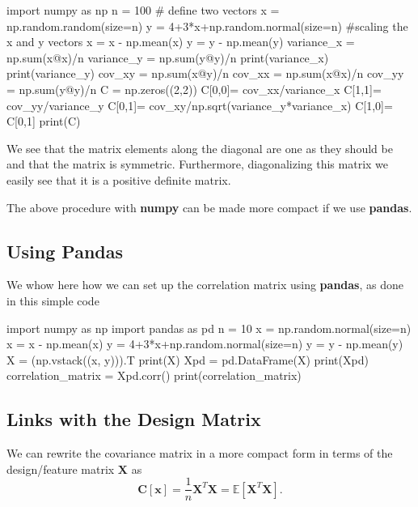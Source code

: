 \documentclass[%
oneside,                 %
final,                   %
10pt]{article}
\begin{document}
\bpycod
import numpy as np
n = 100
# define two vectors                                                                                           
x = np.random.random(size=n)
y = 4+3*x+np.random.normal(size=n)
#scaling the x and y vectors                                                                                   
x = x - np.mean(x)
y = y - np.mean(y)
variance_x = np.sum(x@x)/n
variance_y = np.sum(y@y)/n
print(variance_x)
print(variance_y)
cov_xy = np.sum(x@y)/n
cov_xx = np.sum(x@x)/n
cov_yy = np.sum(y@y)/n
C = np.zeros((2,2))
C[0,0]= cov_xx/variance_x
C[1,1]= cov_yy/variance_y
C[0,1]= cov_xy/np.sqrt(variance_y*variance_x)
C[1,0]= C[0,1]
print(C)

\epycod


We see that the matrix elements along the diagonal are one as they
should be and that the matrix is symmetric. Furthermore, diagonalizing
this matrix we easily see that it is a positive definite matrix.

The above procedure with \textbf{numpy} can be made more compact if we use \textbf{pandas}.

\subsection{Using Pandas}

We whow here how we can set up the correlation matrix using \textbf{pandas}, as done in this simple code














\bpycod
import numpy as np
import pandas as pd
n = 10
x = np.random.normal(size=n)
x = x - np.mean(x)
y = 4+3*x+np.random.normal(size=n)
y = y - np.mean(y)
X = (np.vstack((x, y))).T
print(X)
Xpd = pd.DataFrame(X)
print(Xpd)
correlation_matrix = Xpd.corr()
print(correlation_matrix)

\epycod


\subsection{Links with the Design Matrix}

We can rewrite the covariance matrix in a more compact form in terms of the design/feature matrix $\bm{X}$ as 
\[
\bm{C}[\bm{x}] = \frac{1}{n}\bm{X}^T\bm{X}= \mathbb{E}[\bm{X}^T\bm{X}].
\]
\end{document}

